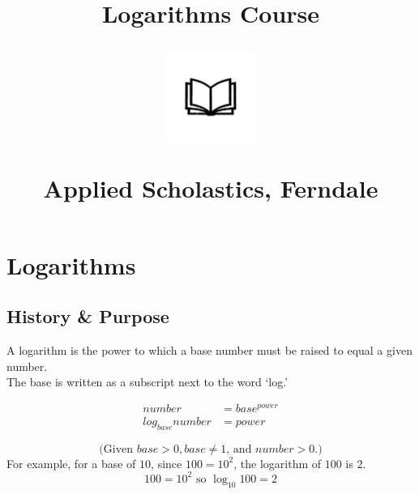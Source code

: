 \documentclass[12pt]{article}
\title{\textbf{Logarithms Course}\\
\begin{center}
\includegraphics[width=4em]{ApS_logo.png}
\end{center}
\begin{normalsize}Applied Scholastics, Ferndale \end{normalsize}}
\author{}
\date{}
\begin{document}
\maketitle

\section*{Logarithms}

\subsection*{History \& Purpose}

A logarithm is the power to which a base number must be raised to equal a given number.\\
The base is written as a subscript next to the word ‘log.’
\begin{Large}
\begin{align*}
number &= base^{power}\\
log_{base} number &= power
\end{align*}
\end{Large}
$$\text{(Given }base>0, base\neq1\text{, and }number>0.)$$
For example, for a base of $10$, since $100 = 10^2$, the logarithm of $100$ is $2$.
  $$100=10^2\text{ so }\log_{10}100=2$$
\end{document}
